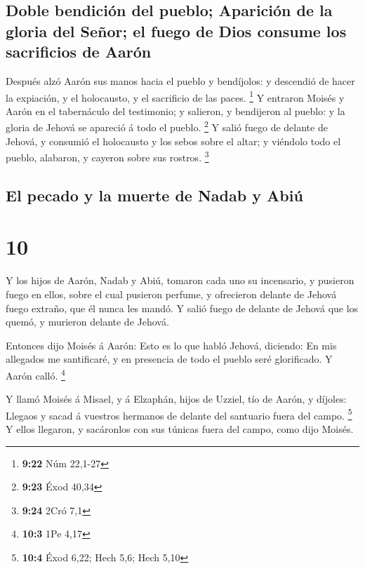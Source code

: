 \hypertarget{doble-bendiciuxf3n-del-pueblo-apariciuxf3n-de-la-gloria-del-seuxf1or-el-fuego-de-dios-consume-los-sacrificios-de-aaruxf3n}{%
\subsection{Doble bendición del pueblo; Aparición de la gloria del
Señor; el fuego de Dios consume los sacrificios de
Aarón}\label{doble-bendiciuxf3n-del-pueblo-apariciuxf3n-de-la-gloria-del-seuxf1or-el-fuego-de-dios-consume-los-sacrificios-de-aaruxf3n}}

 Después alzó Aarón sus manos hacia el pueblo y
bendíjolos: y descendió de hacer la expiación, y el holocausto, y el
sacrificio de las paces. \footnote{\textbf{9:22} Núm 22,1-27}
 Y entraron Moisés y Aarón en el tabernáculo del
testimonio; y salieron, y bendijeron al pueblo: y la gloria de Jehová se
apareció á todo el pueblo. \footnote{\textbf{9:23} Éxod 40,34}
 Y salió fuego de delante de Jehová, y consumió el
holocausto y los sebos sobre el altar; y viéndolo todo el pueblo,
alabaron, y cayeron sobre sus rostros. \footnote{\textbf{9:24} 2Cró 7,1}

\hypertarget{el-pecado-y-la-muerte-de-nadab-y-abiuxfa}{%
\subsection{El pecado y la muerte de Nadab y
Abiú}\label{el-pecado-y-la-muerte-de-nadab-y-abiuxfa}}

\hypertarget{section-9}{%
\section{10}\label{section-9}}

 Y los hijos de Aarón, Nadab y Abiú, tomaron cada uno su
incensario, y pusieron fuego en ellos, sobre el cual pusieron perfume, y
ofrecieron delante de Jehová fuego extraño, que él nunca les mandó.
 Y salió fuego de delante de Jehová que los quemó, y
murieron delante de Jehová.

 Entonces dijo Moisés á Aarón: Esto es lo que habló
Jehová, diciendo: En mis allegados me santificaré, y en presencia de
todo el pueblo seré glorificado. Y Aarón calló. \footnote{\textbf{10:3}
  1Pe 4,17}

 Y llamó Moisés á Misael, y á Elzaphán, hijos de Uzziel,
tío de Aarón, y díjoles: Llegaos y sacad á vuestros hermanos de delante
del santuario fuera del campo. \footnote{\textbf{10:4} Éxod 6,22; Hech
  5,6; Hech 5,10}  Y ellos llegaron, y sacáronlos con sus
túnicas fuera del campo, como dijo Moisés.

